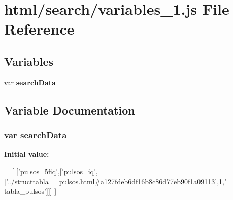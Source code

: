 \section{html/search/variables\+\_\+1.js File Reference}
\label{variables__1_8js}
\subsection*{Variables}
\begin{DoxyCompactItemize}
\item 
var {\bf search\+Data}
\end{DoxyCompactItemize}


\subsection{Variable Documentation}
\subsubsection[{search\+Data}]{\setlength{\rightskip}{0pt plus 5cm}var search\+Data}\label{variables__1_8js_ad01a7523f103d6242ef9b0451861231e}
{\bfseries Initial value\+:}
\begin{DoxyCode}
=
[
  [\textcolor{stringliteral}{'pulsos\_5fiq'},[\textcolor{stringliteral}{'pulsos\_iq'},[\textcolor{stringliteral}{'../structtabla\_\_pulsos.html#a127fdeb6df16b8c86d77eb90f1a09113'},1,\textcolor{stringliteral}{'
      tabla\_pulsos'}]]]
]
\end{DoxyCode}
